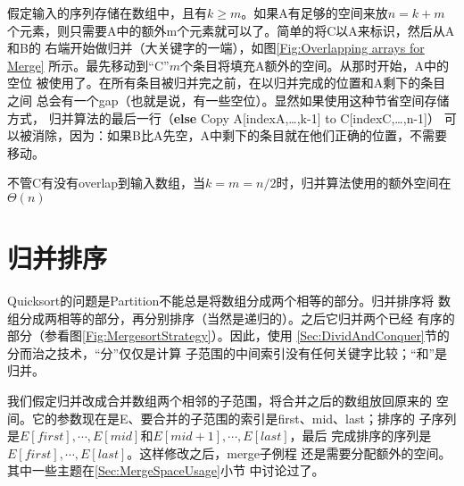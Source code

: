 假定输入的序列存储在数组中，且有$k\geq m$。如果A有足够的空间来放$n=k+m$
个元素，则只需要A中的额外m个元素就可以了。简单的将C以A来标识，然后从A和B的
右端开始做归并（大关键字的一端），如图\ref{Fig:Overlapping arrays for Merge}
所示。最先移动到“C”$m$个条目将填充A额外的空间。从那时开始，A中的空位
被使用了。在所有条目被归并完之前，在以归并完成的位置和A剩下的条目之间
总会有一个gap（也就是说，有一些空位）。显然如果使用这种节省空间存储方式，
归并算法的最后一行（\textbf{else} Copy A[indexA,…,k-1] to C[indexC,…,n-1]）
可以被消除，因为：如果B比A先空，A中剩下的条目就在他们正确的位置，不需要移动。

不管C有没有overlap到输入数组，当$k=m=n/2$时，归并算法使用的额外空间在$\Theta(n)$

\section{归并排序}\label{Sec:Mergesort}

\begin{figure*}[!t]
    \centering
    \caption{归并排序策略}
    \label{Fig:MergesortStrategy}
\end{figure*}

Quicksort的问题是Partition不能总是将数组分成两个相等的部分。归并排序将
数组分成两相等的部分，再分别排序（当然是递归的）。之后它归并两个已经
有序的部分（参看图\ref{Fig:MergesortStrategy}）。因此，使用
\ref{Sec:DividAndConquer}节的分而治之技术，“分”仅仅是计算
子范围的中间索引没有任何关键字比较；“和”是归并。

我们假定归并改成合并数组两个相邻的子范围，将合并之后的数组放回原来的
空间。它的参数现在是E、要合并的子范围的索引是first、mid、last；排序的
子序列是$E[first],\cdots ,E[mid]$和$E[mid+1],\cdots ,E[last]$，最后
完成排序的序列是$E[first],\cdots ,E[last]$。这样修改之后，merge子例程
还是需要分配额外的空间。其中一些主题在\ref{Sec:MergeSpaceUsage}小节
中讨论过了。

